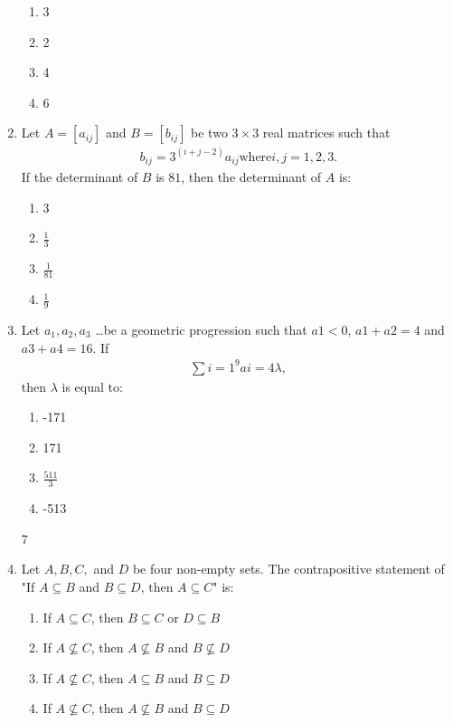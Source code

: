 \documentclass{article}
\begin{document}
\begin{enumerate}
\begin{enumerate}
   \item 3
   \item 2
   \item 4
   \item 6
\end{enumerate}

\item Let $A = [a_{ij}]$ and $B = [b_{ij}]$ be two $3 \times 3$ real matrices such that\begin{align*}b_{ij} = 3^{(i+j-2)} a_{ij} \text{where} i,j = 1,2,3.\end{align*}If the determinant of $B$ is $81$, then the determinant of $A$ is:

\begin{enumerate}
   \item 3
   \item $\frac{1}{3}$
   \item $\frac{1}{81}$
   \item $\frac{1}{9}$
\end{enumerate}

\item Let $a_1, a_2, a_3 $ \dots be a geometric progression such that $a 1 < 0$, $a 1 + a 2 = 4$ and $a 3 + a 4 = 16$. If\begin{align*}\sum {i=1}^{9} a i = 4\lambda,\end{align*}then $\lambda$ is equal to:

\begin{enumerate}
   \item -171
   \item 171
   \item $\frac{511}{3}$
   \item -513
\end{enumerate}
7
\item Let $A, B, C,$ and $D$ be four non-empty sets. The contrapositive statement of "If $A \subseteq B$ and $B \subseteq D$, then $A \subseteq C$" is:

\begin{enumerate}
   \item If $A \subseteq C$, then $B \subseteq C$ or $D \subseteq B$
   \item If $A \not\subseteq C$, then $A \not\subseteq B$ and $B \not\subseteq D$
   \item If $A \not\subseteq C$, then $A \subseteq B$ and $B \subseteq D$
   \item If $A \not\subseteq C$, then $A \not\subseteq B$ and $B \subseteq D$
\end{enumerate}


\end{enumerate}
\end{document}
